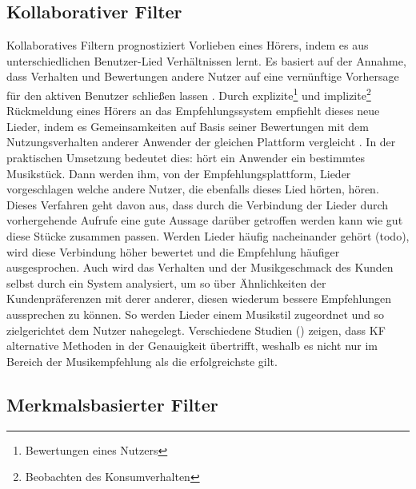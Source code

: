\documentclass[twosided,a4,10pt]{article}
\begin{document}
\begin{multicols}{2}
		\subsection{Kollaborativer Filter}
		Kollaboratives Filtern prognostiziert Vorlieben eines Hörers, indem es aus unterschiedlichen Benutzer-Lied Verhältnissen lernt. Es basiert auf der Annahme, dass Verhalten und Bewertungen andere Nutzer auf eine vernünftige Vorhersage für den aktiven Benutzer schließen lassen \cite{celma}. Durch explizite\footnote[4]{ Bewertungen eines Nutzers} und implizite\footnote[5]{Beobachten des Konsumverhalten} Rückmeldung eines Hörers an das Empfehlungssystem empfiehlt dieses neue Lieder, indem es Gemeinsamkeiten auf Basis seiner Bewertungen mit dem Nutzungsverhalten anderer Anwender der gleichen Plattform vergleicht \cite{mcfee}.\newline
		In der praktischen Umsetzung bedeutet dies: hört ein Anwender ein bestimmtes Musikstück. Dann werden ihm, von der Empfehlungsplattform, Lieder vorgeschlagen welche andere Nutzer, die ebenfalls dieses Lied hörten, hören. Dieses Verfahren geht davon aus, dass durch die Verbindung der Lieder durch vorhergehende Aufrufe eine gute Aussage darüber getroffen werden kann wie gut diese Stücke zusammen passen. Werden Lieder häufig nacheinander gehört (todo), wird diese Verbindung höher bewertet und die Empfehlung häufiger ausgesprochen. Auch wird das Verhalten und der Musikgeschmack des Kunden selbst durch ein System analysiert, um so über Ähnlichkeiten der Kundenpräferenzen mit derer anderer, diesen wiederum bessere Empfehlungen aussprechen zu können. So werden Lieder einem Musikstil zugeordnet und so zielgerichtet dem Nutzer nahegelegt.\newline
		Verschiedene Studien (\cite{mcfee}\cite{barrington}) zeigen, dass KF alternative Methoden in der Genauigkeit übertrifft, weshalb es nicht nur im Bereich der Musikempfehlung als die erfolgreichste gilt.\newline
		
		\subsection{Merkmalsbasierter Filter}

\end{multicols}
\end{document}
